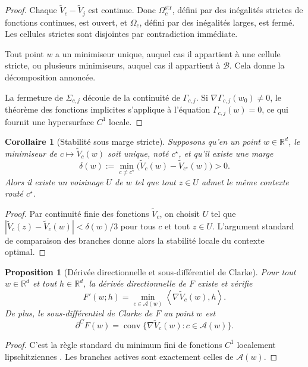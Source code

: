 \documentclass[11pt,a4paper]{article}
\newtheorem{proposition}{Proposition}[section]
\newtheorem{corollary}{Corollaire}[section]
\newcommand{\R}{\mathbb R}
\begin{document}
\begin{proof}
Chaque \(\widetilde V_c-\widetilde V_j\) est continue. Donc \(\Omega_c^{\mathrm{str}}\), défini par des inégalités strictes de fonctions continues, est ouvert, et \(\Omega_c\), défini par des inégalités larges, est fermé. Les cellules strictes sont disjointes par contradiction immédiate.

Tout point \(w\) a un minimiseur unique, auquel cas il appartient à une cellule stricte, ou plusieurs minimiseurs, auquel cas il appartient à \(\mathcal B\). Cela donne la décomposition annoncée.

La fermeture de \(\Sigma_{c,j}\) découle de la continuité de \(\Gamma_{c,j}\). Si \(\nabla\Gamma_{c,j}(w_0)\neq 0\), le théorème des fonctions implicites s'applique à l'équation \(\Gamma_{c,j}(w)=0\), ce qui fournit une hypersurface \(C^1\) locale.
\end{proof}

\begin{corollary}[Stabilité sous marge stricte]
Supposons qu'en un point \(w\in\R^d\), le minimiseur de \(c\mapsto \widetilde V_c(w)\) soit unique, noté \(c^\star\), et qu'il existe une marge
\[
\delta(w):=\min_{c\neq c^\star}\bigl(\widetilde V_c(w)-\widetilde V_{c^\star}(w)\bigr)>0.
\]
Alors il existe un voisinage \(U\) de \(w\) tel que tout \(z\in U\) admet le même contexte routé \(c^\star\).
\end{corollary}

\begin{proof}
Par continuité finie des fonctions \(\widetilde V_c\), on choisit \(U\) tel que \(|\widetilde V_c(z)-\widetilde V_c(w)|<\delta(w)/3\) pour tous \(c\) et tout \(z\in U\). L'argument standard de comparaison des branches donne alors la stabilité locale du contexte optimal.
\end{proof}

\begin{proposition}[Dérivée directionnelle et sous-différentiel de Clarke]
Pour tout \(w\in\R^d\) et tout \(h\in\R^d\), la dérivée directionnelle de \(F\) existe et vérifie
\[
F'(w;h)=\min_{c\in\mathcal A(w)}\left\langle \nabla \widetilde V_c(w),h\right\rangle.
\]
De plus, le sous-différentiel de Clarke de \(F\) au point \(w\) est
\[
\partial^C F(w)
=
\operatorname{conv}\{\nabla \widetilde V_c(w): c\in\mathcal A(w)\}.
\]
\end{proposition}

\begin{proof}
C'est la règle standard du minimum fini de fonctions \(C^1\) localement lipschitziennes \cite{Clarke1983}. Les branches actives sont exactement celles de \(\mathcal A(w)\).
\end{proof}
\end{document}
